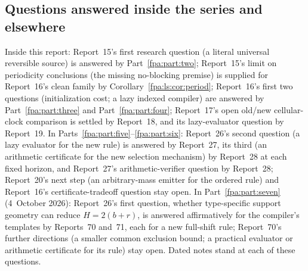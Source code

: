 \documentclass[11pt,a4paper]{article}
\numberwithin{equation}{section}
\begin{document}
\subsection{Questions answered inside the series and elsewhere}\label{fpa:sec:answered}
Inside this report: Report~15's first research question (a literal universal reversible source) is answered by Part~\ref{fpa:part:two}; Report~15's limit on periodicity conclusions (the missing no-blocking premise) is supplied for Report~16's clean family by Corollary~\ref{fpa:ls:cor:period}; Report~16's first two questions (initialization cost; a lazy indexed compiler) are answered by Part~\ref{fpa:part:three} and Part~\ref{fpa:part:four}; Report~17's open old/new cellular-clock comparison is settled by Report~18, and its lazy-evaluator question by Report~19. In Parts~\ref{fpa:part:five}--\ref{fpa:part:six}: Report~26's second question (a lazy evaluator for the new rule) is answered by Report~27, its third (an arithmetic certificate for the new selection mechanism) by Report~28 at each fixed horizon, and Report~27's arithmetic-verifier question by Report~28; Report~20's next step (an arbitrary-mass emitter for the ordered rule) and Report~16's certificate-tradeoff question stay open. In Part~\ref{fpa:part:seven} (4~October 2026): Report~26's first question, whether type-specific support geometry can reduce $H=2(b+r)$, is answered affirmatively for the compiler's templates by Reports~70 and~71, each for a new full-shift rule; Report~70's further directions (a smaller common exclusion bound; a practical evaluator or arithmetic certificate for its rule) stay open. Dated notes stand at each of these questions.
\end{document}

